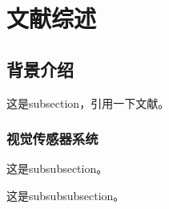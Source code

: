 \section{文献综述}
\subsection{背景介绍}
这是subsection，引用一下文献\cite{Wahl2012ADP}。

\subsubsection{视觉传感器系统}
这是subsubsection。

这是subsubsubsection。


